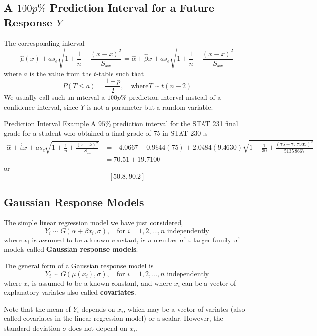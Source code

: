 \documentclass[oneside]{book}
\begin{document}
\subsection{A $ 100p\% $ Prediction Interval for a Future Response $ Y $}
The corresponding interval
\[\hat{\mu}(x) \pm a s_{e} \sqrt{1+\frac{1}{n}+\frac{(x-\bar{x})^{2}}{S_{x x}}}=\hat{\alpha}+\hat{\beta} x \pm a s_{e} \sqrt{1+\frac{1}{n}+\frac{(x-\bar{x})^{2}}{S_{x x}}}\]
where $ a $ is the value from the $ t $-table such that
\[P(T \leq a)=\frac{1+p}{2}, \quad \text{where} T \sim t(n-2)\]
We usually call such an interval a $ 100p\% $ prediction interval instead of a confidence interval,
since $ Y $ is not a parameter but a random variable.


\begin{Example}{Prediction Interval Example}{}
    A $ 95\% $ prediction interval for the STAT 231 final grade for a student who obtained
    a final grade of $ 75 $ in STAT 230 is
    \begin{align*}
        \hat{\alpha}+\hat{\beta} x \pm a s_{e} \sqrt{1+\frac{1}{n}+\frac{(x-\bar{x})^{2}}{S_{x x}}}
         & =-4.0667+0.9944(75) \pm 2.0484(9.4630) \sqrt{1+\frac{1}{30}+\frac{(75-76.7333)^{2}}{5135.8667}} \\
         & =70.51 \pm 19.7100
    \end{align*}
    or
    \[ \left[ 50.8,90.2 \right] \]
\end{Example}


\subsection{Gaussian Response Models}
The simple linear regression model we have just considered,
\[ Y_i \sim G(\alpha+\beta x_i,\sigma),\quad \text{for } i=1,2, \ldots, n \text{ independently} \]
where $ x_i $ is assumed to be a known constant, is a member of a larger family of models
called \textbf{Gaussian response models}.

The general form of a Gaussian response model is
\[Y_{i} \sim G\left(\mu\left(x_{i}\right), \sigma\right), \quad \text{for } i=1,2, \ldots, n \text{ independently}\]
where $ x_i $ is assumed to be a known constant, and where $ x_i $ can be a vector of explanatory
variates also called \textbf{covariates}.

Note that the mean of $ Y_i $ depends on $ x_i $, which may be a vector of variates (also called
covariates in the linear regression model) or a scalar. However, the standard deviation $ \sigma $
does not depend on $ x_i $.
\end{document}

